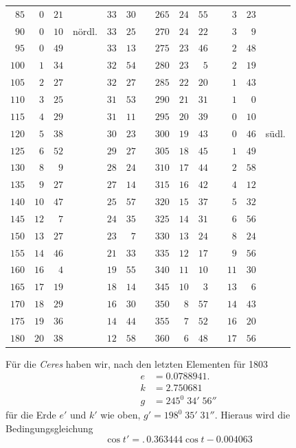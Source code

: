 \begin{center}
\begin{tabular}{r|rrl|rrl||r|rrl|rrl}
$85$&$0$&$21$&&$33$&$30$&&$265$&$24$&$55$&&$3$&$23$&\\
$90$&$0$&$10$&nördl.&$33$&$25$&&$270$&$24$&$22$&&$3$&$9$&\\
$95$&$0$&$49$&&$33$&$13$&&$275$&$23$&$46$&&$2$&$48$&\\
$100$&$1$&$34$&&$32$&$54$&&$280$&$23$&$5$&&$2$&$19$&\\
$105$&$2$&$27$&&$32$&$27$&&$285$&$22$&$20$&&$1$&$43$&\\
$110$&$3$&$25$&&$31$&$53$&&$290$&$21$&$31$&&$1$&$0$&\\
$115$&$4$&$29$&&$31$&$11$&&$295$&$20$&$39$&&$0$&$10$&\\
$120$&$5$&$38$&&$30$&$23$&&$300$&$19$&$43$&&$0$&$46$&südl.\\
$125$&$6$&$52$&&$29$&$27$&&$305$&$18$&$45$&&$1$&$49$&\\
$130$&$8$&$9$&&$28$&$24$&&$310$&$17$&$44$&&$2$&$58$&\\
$135$&$9$&$27$&&$27$&$14$&&$315$&$16$&$42$&&$4$&$12$&\\
$140$&$10$&$47$&&$25$&$57$&&$320$&$15$&$37$&&$5$&$32$&\\
$145$&$12$&$7$&&$24$&$35$&&$325$&$14$&$31$&&$6$&$56$&\\
$150$&$13$&$27$&&$23$&$7$&&$330$&$13$&$24$&&$8$&$24$&\\
$155$&$14$&$46$&&$21$&$33$&&$335$&$12$&$17$&&$9$&$56$&\\
$160$&$16$&$4$&&$19$&$55$&&$340$&$11$&$10$&&$11$&$30$&\\
$165$&$17$&$19$&&$18$&$14$&&$345$&$10$&$3$&&$13$&$6$&\\
$170$&$18$&$29$&&$16$&$30$&&$350$&$8$&$57$&&$14$&$43$&\\
$175$&$19$&$36$&&$14$&$44$&&$355$&$7$&$52$&&$16$&$20$&\\
$180$&$20$&$38$&&$12$&$58$&&$360$&$6$&$48$&&$17$&$56$&
\end{tabular}
\endgroup
\end{center}

Für die \textit{Ceres} haben wir, nach den letzten Elementen für 1803
\[
\begin{aligned}
e&=0.0788941.\\
k&=2.750681\\
g&=245^0\;34'\;56''
\end{aligned}
\]
für die Erde $e'$ und $k'$ wie oben, $g'=198^0\;35'\;31''$.
Hieraus wird die Bedingungsgleichung
\[
\cos t'=.\,0.363444\cos t-0.004063
\]

